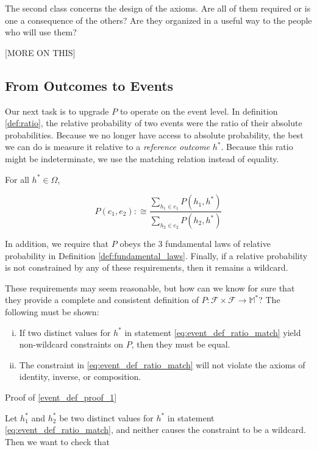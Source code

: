 \documentclass[twoside]{article}
\theoremstyle{plain}%
\theoremstyle{definition}
\theoremstyle{remark}
\begin{document}
The second class concerns the design of the axioms. Are all of them required or is one a consequence of the others? Are they organized in a useful way to the people who will use them?

[MORE ON THIS]

\subsection{From Outcomes to Events}

Our next task is to upgrade \(P\) to operate on the event level. In definition \ref{def:ratio}, the relative probability of two events were the ratio of their absolute probabilities. Because we no longer have access to absolute probability, the best we can do is measure it relative to a \textit{reference outcome} \(h^*\). Because this ratio might be indeterminate, we use the matching relation instead of equality.

For all \(h^* \in \Omega\),

\begin{equation}
\label{eq:event_def_ratio_match}
P(e_1, e_2) :\cong \frac{\sum_{h_1 \in e_1} P(h_1, h^*)}{\sum_{h_2 \in e_2} P(h_2, h^*)}
\end{equation}

In addition, we require that \(P\) obeys the 3 fundamental laws of relative probability in Definition \ref{def:fundamental_laws}. Finally, if a relative probability is not constrained by any of these requirements, then it remains a wildcard.

These requirements may seem reasonable, but how can we know for sure that they provide a complete and consistent definition of \(P: \mathcal{F} \times \mathcal{F} \rightarrow \mathbb{M}^*\)? The following must be shown:

\begin{enumerate}[(i)]
  \item \label{event_def_proof_1} If two distinct values for \(h^*\) in statement \ref{eq:event_def_ratio_match} yield non-wildcard constraints on \(P\), then they must be equal.
  \item \label{event_def_proof_2} The constraint in \ref{eq:event_def_ratio_match} will not violate the axioms of identity, inverse, or composition.
\end{enumerate}

Proof of \ref{event_def_proof_1}

Let \(h_1^*\) and \(h_2^*\) be two distinct values for \(h^*\) in statement \ref{eq:event_def_ratio_match}, and neither causes the constraint to be a wildcard. Then we want to check that
\end{document}
